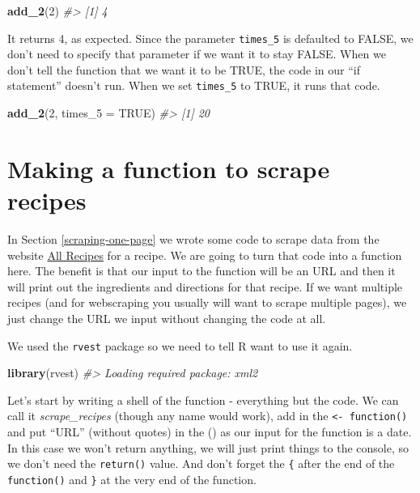 \documentclass[
  12pt,
]{book}
\newenvironment{Shaded}{\begin{snugshade}}{\end{snugshade}}
\newcommand{\CommentTok}[1]{\textcolor[rgb]{0.37,0.37,0.37}{\textit{#1}}}
\newcommand{\DataTypeTok}[1]{\textcolor[rgb]{0.27,0.27,0.27}{#1}}
\newcommand{\DecValTok}[1]{\textcolor[rgb]{0.06,0.06,0.06}{#1}}
\newcommand{\KeywordTok}[1]{\textcolor[rgb]{0.27,0.27,0.27}{\textbf{#1}}}
\newcommand{\NormalTok}[1]{#1}
\newcommand{\OtherTok}[1]{\textcolor[rgb]{0.37,0.37,0.37}{#1}}
\begin{document}
\begin{Shaded}
\begin{Highlighting}[]
\KeywordTok{add\_2}\NormalTok{(}\DecValTok{2}\NormalTok{)}
\CommentTok{\#> [1] 4}
\end{Highlighting}
\end{Shaded}

It returns 4, as expected. Since the parameter \texttt{times\_5} is defaulted to FALSE, we don't need to specify that parameter if we want it to stay FALSE. When we don't tell the function that we want it to be TRUE, the code in our ``if statement'' doesn't run. When we set \texttt{times\_5} to TRUE, it runs that code.

\begin{Shaded}
\begin{Highlighting}[]
\KeywordTok{add\_2}\NormalTok{(}\DecValTok{2}\NormalTok{, }\DataTypeTok{times\_5 =} \OtherTok{TRUE}\NormalTok{)}
\CommentTok{\#> [1] 20}
\end{Highlighting}
\end{Shaded}

\hypertarget{recipes-function}{%
\section{Making a function to scrape recipes}\label{recipes-function}}

In Section \ref{scraping-one-page} we wrote some code to scrape data from the website \href{https://www.allrecipes.com/}{All Recipes} for a recipe. We are going to turn that code into a function here. The benefit is that our input to the function will be an URL and then it will print out the ingredients and directions for that recipe. If we want multiple recipes (and for webscraping you usually will want to scrape multiple pages), we just change the URL we input without changing the code at all.

We used the \texttt{rvest} package so we need to tell R want to use it again.

\begin{Shaded}
\begin{Highlighting}[]
\KeywordTok{library}\NormalTok{(rvest)}
\CommentTok{\#> Loading required package: xml2}
\end{Highlighting}
\end{Shaded}

Let's start by writing a shell of the function - everything but the code. We can call it \emph{scrape\_recipes} (though any name would work), add in the \texttt{\textless{}-\ function()} and put ``URL'' (without quotes) in the () as our input for the function is a date. In this case we won't return anything, we will just print things to the console, so we don't need the \texttt{return()} value. And don't forget the \texttt{\{} after the end of the \texttt{function()} and \texttt{\}} at the very end of the function.
\end{document}
